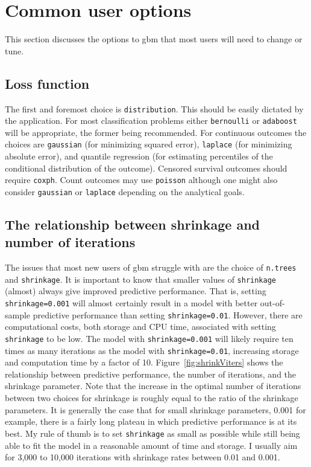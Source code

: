\documentclass{article}
\begin{document}
\section{Common user options}

This section discusses the options to gbm that most users will need to change or tune.

\subsection{Loss function}

The first and foremost choice is \texttt{distribution}. This should be easily dictated by the application. For most classification problems either \texttt{bernoulli} or \texttt{adaboost} will be appropriate, the former being recommended. For continuous outcomes the choices are \texttt{gaussian} (for minimizing squared error), \texttt{laplace} (for minimizing absolute error), and quantile regression (for estimating percentiles of the conditional distribution of the outcome). Censored survival outcomes should require \texttt{coxph}. Count outcomes may use \texttt{poisson} although one might also consider \texttt{gaussian} or \texttt{laplace} depending on the analytical goals.

\subsection{The relationship between shrinkage and number of iterations} The issues that most new users of gbm struggle with are the choice of \texttt{n.trees} and \texttt{shrinkage}. It is important to know that smaller values of \texttt{shrinkage} (almost) always give improved predictive performance. That is, setting \texttt{shrinkage=0.001} will almost certainly result in a model with better out-of-sample predictive performance than setting \texttt{shrinkage=0.01}. However, there are computational costs, both storage and CPU time, associated with setting \texttt{shrinkage} to be low. The model with \texttt{shrinkage=0.001} will likely require ten times as many iterations as the model with \texttt{shrinkage=0.01}, increasing storage and computation time by a factor of 10. Figure~\ref{fig:shrinkViters} shows the relationship between predictive performance, the number of iterations, and the shrinkage parameter. Note that the increase in the optimal number of iterations between two choices for shrinkage is roughly equal to the ratio of the shrinkage parameters. It is generally the case that for small shrinkage parameters, 0.001 for example, there is a fairly long plateau in which predictive performance is at its best. My rule of thumb is to set \texttt{shrinkage} as small as possible while still being able to fit the model in a reasonable amount of time and storage. I usually aim for 3,000 to 10,000 iterations with shrinkage rates between 0.01 and 0.001.
\end{document}
